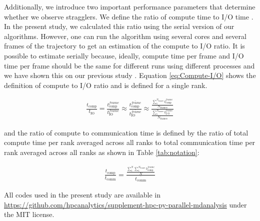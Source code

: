 Additionally, we introduce two important performance parameters that determine whether we observe stragglers.
We define the ratio of compute time to I/O time . 
In the present study, we calculated this ratio using the serial version of our algorithms.
However, one can run the algorithm using several cores and several frames of the trajectory to get an estimation of the compute to I/O ratio. 
It is possible to estimate  serially because, ideally, compute time per frame and I/O time per frame should be the same for different runs using different processes and we have shown this on our previous study \cite{Khoshlessan:2017ab}. Equation \ref{eq:Compute-I/O} shows the definition of compute to I/O ratio and is defined for a single rank.
 

\begin{gather}
  \label{eq:Compute-I/O}
    \frac{t_{\text{comp}}}{t_{\text{IO}}}=\frac{t_{\text{comp}}^{frame}}{t_{\text{IO}}^{frame}} \approx \frac{\overline{t_{\text{comp}}^{frame}}}{\overline{t_{\text{IO}}^{frame}}} \approx \frac{\frac{\sum_{1}^{N_{\text{frames}}}t_{\text{comp}}^{frame}}{N_{\text{frames}}}}{\frac{\sum_{1}^{N_{\text{frames}}}t_{\text{I/O}}^{frame}}{N_{\text{frames}}}} 
 \end{gather}

and the ratio of compute to communication time is defined by the ratio of total compute time per rank averaged across all ranks to total communication time per rank averaged across all ranks as shown in Table \ref{tab:notation}:

\begin{gather}
  \label{eq:Compute-comm}
       \frac{t_{\text{comp}}}{t_{\text{comm}}}= \frac{\frac{\sum_{1}^{N}\sum_{1}^{N_{\text{frames}}}t_{\text{comp}}^{frame}}{N}}{\overline{t_{\text{comm}}}}  
 \end{gather}
 
All codes used in the present study are available in \url{https://github.com/hpcanalytics/supplement-hpc-py-parallel-mdanalysis} under the MIT license. 
 
